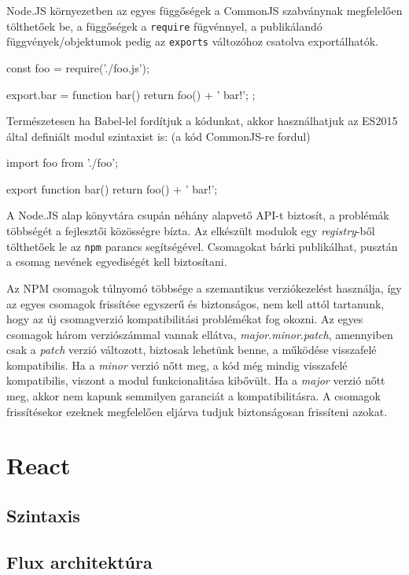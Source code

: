 Node.JS környezetben az egyes függőségek a CommonJS szabványnak megfelelően
tölthetőek be, a függőségek a \texttt{require} fügvénnyel, a publikálandó
függvények/objektumok pedig az \texttt{exports} változóhoz csatolva
exportálhatók.

\begin{js}
const foo = require('./foo.js');

export.bar = function bar() {
  return foo() + ' bar!';
};
\end{js}

Természetesen ha Babel-lel fordítjuk a kódunkat, akkor használhatjuk az ES2015
által definiált modul szintaxist is: (a kód CommonJS-re fordul)

\begin{js}
import foo from './foo';

export function bar() {
  return foo() + ' bar!';
}
\end{js}

A Node.JS alap könyvtára csupán néhány alapvető API-t biztosít, a problémák
többségét a fejlesztői közösségre bízta.  Az elkészült modulok egy
\emph{registry}-ből tölthetőek le az \texttt{npm} parancs segítségével.
Csomagokat bárki publikálhat, pusztán a csomag nevének egyediségét kell
biztosítani.

Az NPM csomagok túlnyomó többsége a szemantikus verziókezelést használja, így az
egyes csomagok frissítése egyszerű és biztonságos, nem kell attól tartanunk,
hogy az új csomagverzió kompatibilitási problémékat fog okozni.  Az egyes
csomagok három verziószámmal vannak ellátva,
\emph{major}.\emph{minor}.\emph{patch}, amennyiben csak a \emph{patch} verzió
változott, biztosak lehetünk benne, a működése visszafelé kompatibilis.  Ha a
\emph{minor} verzió nőtt meg, a kód még mindig visszafelé kompatibilis, viszont
a modul funkcionalitása kibővült.  Ha a \emph{major} verzió nőtt meg, akkor nem
kapunk semmilyen garanciát a kompatibilitásra.  A csomagok frissítésekor ezeknek
megfelelően eljárva tudjuk biztonságosan frissíteni azokat.

\section{React}

\subsection{Szintaxis}

\subsection{Flux architektúra}

